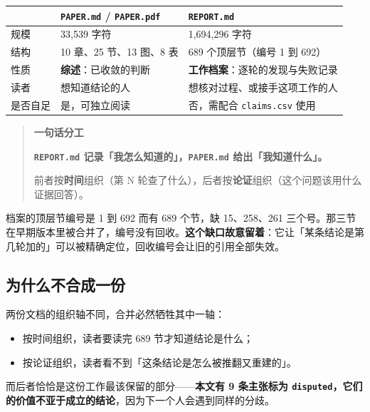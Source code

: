 \begin{table}[t]
\centering
\footnotesize
\setlength{\tabcolsep}{4pt}
\label{tab:26}
\begin{tabular}{lll}
\toprule
 & \texttt{PAPER.md} / \texttt{PAPER.pdf} & \texttt{REPORT.md} \\
\midrule
规模 & 33,539 字符 & 1,694,296 字符 \\
结构 & 10 章、25 节、13 图、8 表 & 689 个顶层节（编号 1 到 692） \\
性质 & \textbf{综述}：已收敛的判断 & \textbf{工作档案}：逐轮的发现与失败记录 \\
读者 & 想知道结论的人 & 想核对过程、或接手这项工作的人 \\
是否自足 & 是，可独立阅读 & 否，需配合 \texttt{claims.csv} 使用 \\
\bottomrule
\end{tabular}
\end{table}

\begin{quote}\small
\textbf{ 一句话分工}

\textbf{\texttt{REPORT.md} 记录「我怎么知道的」，\texttt{PAPER.md} 给出「我知道什么」。}

前者按\textbf{时间}组织（第 N 轮查了什么），后者按\textbf{论证}组织（这个问题该用什么证据回答）。

\end{quote}

 档案的顶层节编号是 1 到 692 而有 689 个节，缺 15、258、261 三个号。那三节在早期版本里被合并了，编号没有回收。\textbf{这个缺口故意留着}：它让「某条结论是第几轮加的」可以被精确定位，回收编号会让旧的引用全部失效。


\subsection{为什么不合成一份}

两份文档的组织轴不同，合并必然牺牲其中一轴：


\begin{itemize}
  \item 按时间组织，读者要读完 689 节才知道结论是什么；
  \item 按论证组织，读者看不到「这条结论是怎么被推翻又重建的」。
\end{itemize}

而后者恰恰是这份工作最该保留的部分——\textbf{本文有 9 条主张标为 \texttt{disputed}，它们的价值不亚于成立的结论}，因为下一个人会遇到同样的分歧。


